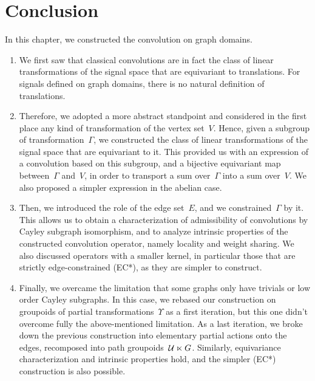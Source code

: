 \section{Conclusion}

In this chapter, we constructed the convolution on graph domains.

\begin{enumerate}
\item We first saw that classical convolutions are in fact the class of linear transformations of the signal space that are equivariant to translations. For signals defined on graph domains, there is no natural definition of translations.
\item Therefore, we adopted a more abstract standpoint and considered in the first place any kind of transformation of the vertex set~$V$. Hence, given a subgroup of transformation~$\Gamma$, we constructed the class of linear transformations of the signal space that are equivariant to it. This provided us with an expression of a convolution based on this subgroup, and a bijective equivariant map between~$\Gamma$ and~$V$, in order to transport a sum over~$\Gamma$ into a sum over~$V$. We also proposed a simpler expression in the abelian case.
\item Then, we introduced the role of the edge set~$E$, and we constrained~$\Gamma$ by it. This allows us to obtain a characterization of admissibility of convolutions by Cayley subgraph isomorphism, and to analyze intrinsic properties of the constructed convolution operator, namely locality and weight sharing. We also discussed operators with a smaller kernel, in particular those that are strictly edge-constrained (EC*), as they are simpler to construct.
\item Finally, we overcame the limitation that some graphs only have trivials or low order Cayley subgraphs. In this case, we rebased our construction on groupoids of partial transformations~$\Upsilon$ as a first iteration, but this one didn't overcome fully the above-mentioned limitation. As a last iteration, we broke down the previous construction into elementary partial actions onto the edges, recomposed into path groupoids~$\mathcal{U} \ltimes G$. Similarly, equivariance characterization and intrinsic properties hold, and the simpler (EC*) construction is also possible.
\end{enumerate}

